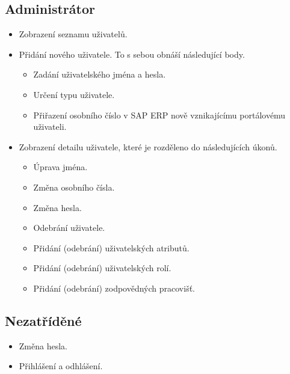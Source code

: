 \documentclass[thesis=M,czech]{FITthesis}[2012/06/26]
\begin{document}
\subsection{Administrátor}

\begin{itemize}
	\item
	Zobrazení seznamu uživatelů.
	\item
	Přidání nového uživatele. To s sebou obnáší následující body.
	\begin{itemize}
		\item
	    Zadání uživatelského jména a hesla.
	    \item
	    Určení typu uživatele.
	    \item
	    Přiřazení osobního číslo v SAP ERP nově vznikajícímu portálovému uživateli.
	\end{itemize} 
    \item
	Zobrazení detailu uživatele, které je rozděleno do následujících úkonů.
	\begin{itemize}
		\item
		Úprava jména.
		\item
		Změna osobního čísla.
		\item
		Změna hesla.
		\item
		Odebrání uživatele.
		\item
		Přidání (odebrání) uživatelských atributů.
		\item
		Přidání (odebrání) uživatelských rolí.
		\item
		Přidání (odebrání) zodpovědných pracovišť.
	\end{itemize} 
\end{itemize} 

\subsection{Nezatříděné}
\begin{itemize}
	\item
	Změna hesla.
	\item
	Přihlášení a odhlášení.
\end{itemize} 
\end{document}
